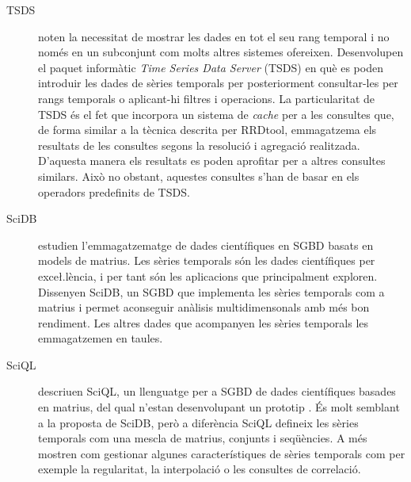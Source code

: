 \begin{description}



\item[TSDS] \textcite{weigel10} noten la necessitat de mostrar les
  dades en tot el seu rang temporal i no només en un subconjunt com
  molts altres sistemes ofereixen. Desenvolupen el paquet informàtic
  \emph{Time Series Data Server} (TSDS) \parencite{tsds} en què es
  poden introduir les dades de sèries temporals per posteriorment
  consultar-les per rangs temporals o aplicant-hi filtres i
  operacions. La particularitat de TSDS és el fet que incorpora un
  sistema de \emph{cache} per a les consultes que, de forma similar a
  la tècnica descrita per RRDtool, emmagatzema els resultats de les
  consultes segons la resolució i agregació realitzada. D'aquesta
  manera els resultats es poden aprofitar per a altres consultes
  similars. Això no obstant, aquestes consultes s'han de basar en els
  operadors predefinits de TSDS.







\item[SciDB] \textcite{stonebraker09:scidb} estudien l'emmagatzematge
  de dades científiques en \gls{SGBD} basats en models de matrius.
  Les sèries temporals són les dades científiques per exce\l.lència, i
  per tant són les aplicacions que principalment exploren.  Dissenyen
  SciDB, un \gls{SGBD} que implementa les sèries temporals com
  a matrius i permet aconseguir anàlisis multidimensonals amb més bon
  rendiment. Les altres dades que acompanyen les sèries temporals les
  emmagatzemen en taules. 





\item[SciQL] \textcite{kersten11,zhang11} descriuen SciQL, un
  llenguatge per a \gls{SGBD} de dades científiques basades en
  matrius, del qual n'estan desenvolupant un
  prototip \parencite{sciql}. És molt semblant a la proposta de SciDB,
  però a diferència SciQL defineix les sèries temporals com una mescla
  de matrius, conjunts i seqüències. A més mostren com gestionar
  algunes característiques de sèries temporals com per exemple la
  regularitat, la interpolació o les consultes de correlació.
\todo{} 








\end{description}
